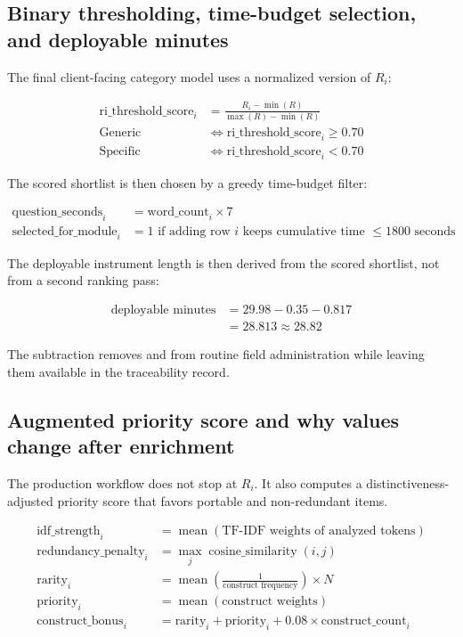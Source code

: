 \documentclass[12pt]{article}
\begin{document}
\subsection{Binary thresholding, time-budget selection, and deployable minutes}

The final client-facing category model uses a normalized version of $R_i$:

\begin{align*}
\text{ri\_threshold\_score}_i &= \frac{R_i - \min(R)}{\max(R) - \min(R)} \\
\text{Generic} &\iff \text{ri\_threshold\_score}_i \geq 0.70 \\
\text{Specific} &\iff \text{ri\_threshold\_score}_i < 0.70
\end{align*}

The scored shortlist is then chosen by a greedy time-budget filter:

\begin{align*}
\text{question\_seconds}_i &= \text{word\_count}_i \times 7 \\
\text{selected\_for\_module}_i &= 1 \text{ if adding row } i \text{ keeps cumulative time } \leq 1800 \text{ seconds}
\end{align*}

The deployable instrument length is then derived from the scored shortlist, not from a second ranking pass:

\begin{align*}
\text{deployable minutes} &= 29.98 - 0.35 - 0.817 \\
&= 28.813 \approx 28.82
\end{align*}

The subtraction removes  and  from routine field administration while leaving them available in the traceability record.

\subsection{Augmented priority score and why values change after enrichment}

The production workflow does not stop at $R_i$. It also computes a distinctiveness-adjusted priority score that favors portable and non-redundant items.

\begin{align*}
\text{idf\_strength}_i &= \operatorname{mean}(\text{TF-IDF weights of analyzed tokens}) \\
\text{redundancy\_penalty}_i &= \max_j \operatorname{cosine\_similarity}(i, j) \\
\text{rarity}_i &= \operatorname{mean}\!\left(\frac{1}{\text{construct frequency}}\right) \times N \\
\text{priority}_i &= \operatorname{mean}(\text{construct weights}) \\
\text{construct\_bonus}_i &= \text{rarity}_i + \text{priority}_i + 0.08 \times \text{construct\_count}_i
\end{align*}
\end{document}
